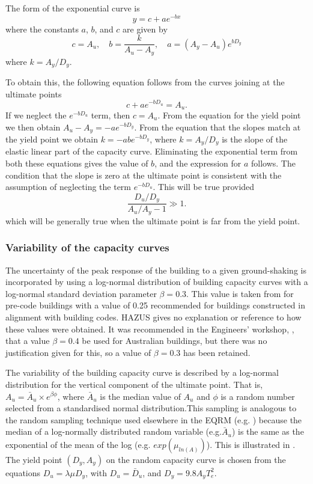 The form of the exponential curve is
$$
 y = c + a e^{-bx}
$$
where the constants $a$, $b$, and $c$ are given by
\begin{equation}
c = A_u,\quad b = \frac{k}{A_u-A_y}, \quad
a = (A_y-A_u)e^{b D_y}
\end{equation}
where $k = A_y/D_y$.

To obtain this, the following equation follows from the curves
joining at the ultimate points
$$
 c+ae^{-bD_u} = A_u.
$$
If we neglect the $e^{-bD_u}$ term, then $c=A_u$. From the
equation for the yield point we then obtain $A_u-A_y =
-ae^{-bD_y}$. From the equation that the slopes match at the yield
point we obtain $k = -abe^{-bD_y}$, where $k=A_y/D_y$ is the slope
of the elastic linear part of the capacity curve. Eliminating the exponential term from both these equations
gives the value of $b$, and the expression for $a$ follows. The
condition that the slope is zero at the ultimate point is
consistent with the assumption of neglecting the term $e^{-bD_u}$.
This will be true provided
$$
 \frac{D_u/D_y}{A_u/A_y-1} \gg 1.
$$
which will be generally true when the ultimate point is far from the
yield point.


\subsubsection{Variability of the capacity curves}
\label{sec:dam-capacity-var}

The uncertainty of the peak response of the building to a given
ground-shaking is incorporated by using a log-normal distribution
of building capacity curves with a
log-normal standard deviation parameter $\beta=0.3$. This value is
taken from \cite{dr_FEMA99b} for pre-code buildings with a value
of 0.25 recommended for buildings constructed in alignment with
building codes. HAZUS gives no explanation or reference to how
these values were obtained. It was recommended in the Engineers'
workshop, \cite{dr_Stehle01a}, that a value $\beta=0.4$ be used
for Australian buildings, but there was no justification given for
this, so a value of $\beta=0.3$ has been retained.

The variability of the building capacity curve is described by a log-normal distribution for the vertical
component of the ultimate point. That is, $A_u=\bar A_u\times
e^{\beta\phi}$, where $\bar A_u$ is the median value of $A_u$ and
$\phi$ is a random number selected from a standardised normal
distribution.This sampling is
analogous to the random sampling technique used elsewhere in the
EQRM (e.g. ) because the median
 of a log-normally distributed random variable (e.g.$\bar A_u$) is the
 same as the exponential of the mean of the log (e.g. $exp(\mu_{ln(A)})$).
 This is illustrated in
. The yield point $(D_y, A_y)$
on the random capacity curve is chosen from
the equations $D_u=\lambda\mu D_y$, with $D_u=\bar D_u$, and $D_y
= 9.8A_yT_e^2$.

